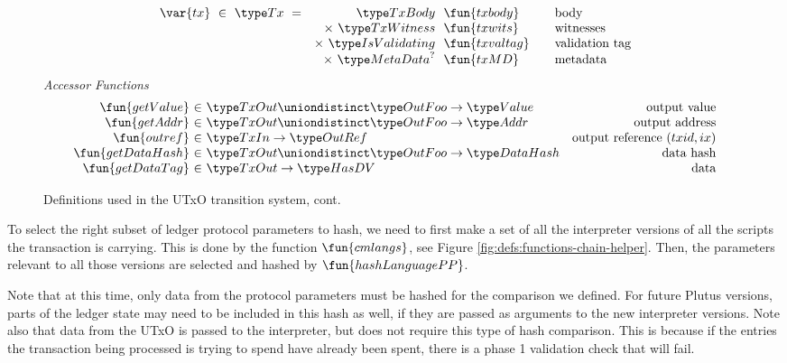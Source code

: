 \begin{figure*}[htb]
  \begin{equation*}
    \begin{array}{r@{~~}r@{~~}l@{\qquad}l}
      \var{tx} ~\in~ \Tx ~=~
      & \TxBody & \fun{txbody} & \text{body}\\
      & \times ~\TxWitness & \fun{txwits} & \text{witnesses}\\
      & \times ~\IsValidating & \fun{txvaltag}&\text{validation tag}\\
      & \times ~\MetaData^? & \fun{txMD}&\text{metadata}\\
    \end{array}
  \end{equation*}
  \emph{Accessor Functions}
  \begin{equation*}
    \begin{array}{r@{~\in~}lr}
      \fun{getValue} & \TxOut \uniondistinct \OutFoo \to \Value & \text{output value} \\
      \fun{getAddr} & \TxOut \uniondistinct \OutFoo \to \Addr & \text{output address} \\
      \fun{outref} & \TxIn \to \OutRef & \text{output reference $(txid,ix)$} \\
      \fun{getDataHash} & \TxOut \uniondistinct \OutFoo \to \DataHash & \text{data hash} \\
      \fun{getDataTag} & \TxOut \to \HasDV & \text{data} \\
    \end{array}
  \end{equation*}
  \caption{Definitions used in the UTxO transition system, cont.}
  \label{fig:defs:utxo-shelley-2}
\end{figure*}

To select the right subset of ledger protocol parameters to hash, we need to
first make a set of all the interpreter versions of all the scripts the
transaction is carrying. This is done by the function $\fun{cmlangs}$,
see Figure \ref{fig:defs:functions-chain-helper}. Then, the parameters
relevant to all those versions are selected and hashed by $\fun{hashLanguagePP}$.

Note that at this time, only data from the protocol parameters must be hashed
for the comparison we defined. For future Plutus versions, parts of the ledger
state may need to be included in this hash as well, if they are passed as
arguments to the new interpreter versions. Note also that data from the UTxO
is passed to the interpreter, but does not require this type of hash comparison.
This is because if the entries the transaction being processed is trying to
spend have already been spent, there is a phase 1 validation check that
will fail.

